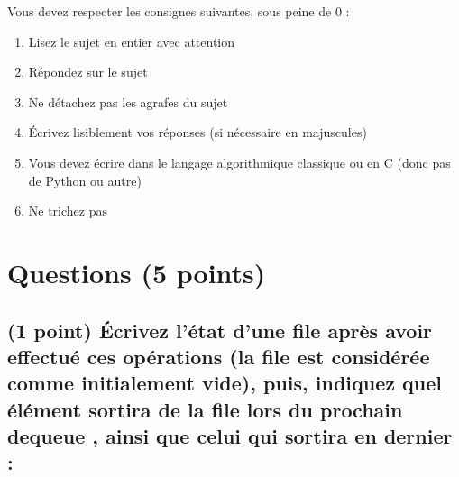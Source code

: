 \documentclass[11pt,a4paper]{article}
\begin{document}
\MakeExamTitle                   %


\bigskip

Vous devez respecter les consignes suivantes, sous peine de 0 :

\begin{enumerate}[label=\Roman*)]
\item Lisez le sujet en entier avec attention
\item Répondez sur le sujet
\item Ne détachez pas les agrafes du sujet
\item \'Ecrivez lisiblement vos réponses (si nécessaire en majuscules)
\item Vous devez écrire dans le langage algorithmique classique ou en C (donc pas de Python ou autre)
\item Ne trichez pas
\end{enumerate}


\vfillFirst

\section{Questions (5 points)}

\subsection{(1 point) \'Ecrivez l'état d'une file après avoir effectué ces opérations (la file est considérée comme initialement vide), puis, indiquez quel élément sortira de la file lors du prochain \og dequeue \fg{}, ainsi que celui qui sortira en dernier : }

\bigskip
\end{document}
